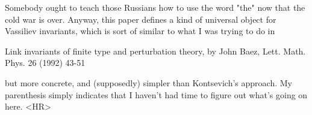 Somebody ought to teach those Russians how to use the word "the" now
that the cold war is over.  Anyway, this paper defines a kind of
universal object for Vassiliev invariants, which is sort of similar to what I
was trying to do in 

Link invariants of finite type and perturbation theory, by John Baez,
Lett. Math. Phys. 26 (1992) 43-51

but more concrete, and (supposedly) simpler than Kontsevich's approach.
My parenthesis simply indicates that I haven't had time to figure out
what's going on here.
<HR>



